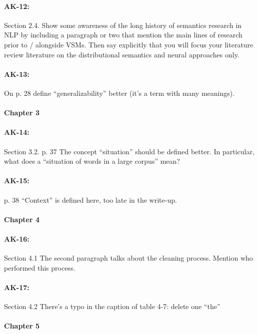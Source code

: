 \documentclass[11pt,a4paper]{article}
\begin{document}
\paragraph{AK-12:} Section 2.4. Show some awareness of the long history of semantics research in NLP by including a paragraph or two that mention the main lines of research prior to / alongside VSMs. Then say explicitly that you will focus your literature review literature on the distributional semantics and neural approaches only.

\paragraph{AK-13:} On p. 28 define “generalizability” better (it’s a term with many meanings).

\paragraph{Chapter 3}

\paragraph{AK-14:} Section 3.2. p. 37 The concept “situation” should be defined better. In particular, what does a “situation of words in a large corpus” mean?

\paragraph{AK-15:} p. 38 “Context” is defined here, too late in the write-up.

\paragraph{Chapter 4}

\paragraph{AK-16:} Section 4.1 The second paragraph talks about the cleaning process. Mention who performed this process.

\paragraph{AK-17:} Section 4.2 There’s a typo in the caption of table 4-7: delete one “the”

\paragraph{Chapter 5}
\end{document}
